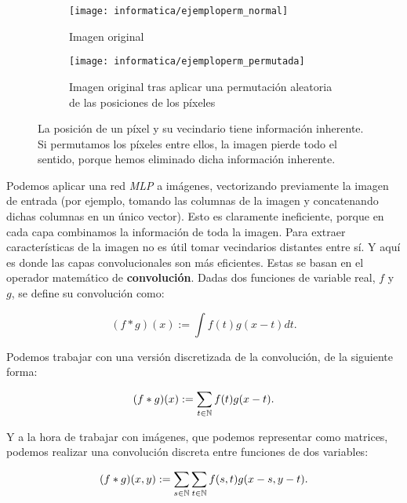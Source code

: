 \begin{figure}[H]
    \centering
    \ajustarsubcaptions
    \begin{subfigure}[t]{0.45\textwidth}
        \centering
        \texttt{[image: informatica/ejemploperm\_normal]}
        \caption{Imagen original}
    \end{subfigure}
    \begin{subfigure}[t]{0.45\textwidth}
        \centering
        \texttt{[image: informatica/ejemploperm\_permutada]}
        \caption{Imagen original tras aplicar una permutación aleatoria de las posiciones de los píxeles}
    \end{subfigure}
    \caption{La posición de un píxel y su vecindario tiene información inherente. Si permutamos los píxeles entre ellos, la imagen pierde todo el sentido, porque hemos eliminado dicha información inherente.}
    \label{img:desordenar_pixeles}
\end{figure}

Podemos aplicar una red \textit{MLP} a imágenes, vectorizando previamente la imagen de entrada (por ejemplo, tomando las columnas de la imagen y concatenando dichas columnas en un único vector). Esto es claramente ineficiente, porque en cada capa combinamos la información de toda la imagen. Para extraer características de la imagen no es útil tomar vecindarios distantes entre sí. Y aquí es donde las capas convolucionales son más eficientes. Estas se basan en el operador matemático de \textbf{convolución}. Dadas dos funciones de variable real, $f$ y $g$, se define su convolución como:

\begin{equation}
    (f * g)(x) := \int f(t) g(x - t) dt.
\end{equation}

Podemos trabajar con una versión discretizada de la convolución, de la siguiente forma:

\begin{equation}
    (f * g)(x) := \sum_{t \in \mathbb{N}} f(t) g(x - t).
\end{equation}

Y a la hora de trabajar con imágenes, que podemos representar como matrices, podemos realizar una convolución discreta entre funciones de dos variables:

\begin{equation}
    (f * g)(x, y) := \sum_{s \in \mathbb{N}} \sum_{t \in \mathbb{N}} f(s, t) g(x - s, y - t).
\end{equation}

